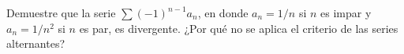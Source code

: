 \item Demuestre que la serie $\sum (-1)^{n-1} a_n$, en donde $a_n = 1/n$ si $n$ es impar y $a_n = 1/n^2$ si $n$ es par, es divergente. ¿Por qué no se aplica el criterio de las series alternantes?
